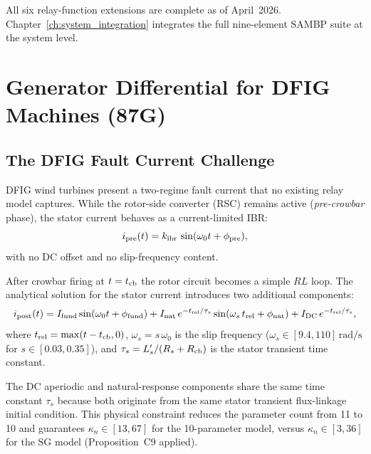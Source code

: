 All six relay-function extensions are complete as of April~2026.  Chapter~\ref{ch:system_integration}
integrates the full nine-element SAMBP suite at the system level.

\section{Generator Differential for DFIG Machines (87G)}
\label{sec:ch6_87g}

\subsection{The DFIG Fault Current Challenge}
\label{sec:ch6_87g_problem}

DFIG wind turbines present a two-regime fault current that no existing relay
model captures.
While the rotor-side converter (RSC) remains active (\emph{pre-crowbar}
phase), the stator current behaves as a current-limited IBR:
\begin{equation}
  i_{\rm pre}(t) = k_{\rm ibr}\,\sin(\omega_0 t + \phi_{\rm pre}),
  \label{eq:ch6_dfig_pre}
\end{equation}
with no DC offset and no slip-frequency content.

After crowbar firing at $t = t_{\rm cb}$ the rotor circuit becomes a simple
$RL$ loop.  The analytical solution for the stator current introduces two
additional components:
\begin{equation}
  i_{\rm post}(t) =
    I_{\rm fund}\sin(\omega_0 t + \phi_{\rm fund})
    + I_{\rm nat}\,e^{-t_{\rm rel}/\tau_s}\sin(\omega_s\,t_{\rm rel} + \phi_{\rm nat})
    + I_{\rm DC}\,e^{-t_{\rm rel}/\tau_s},
  \label{eq:ch6_dfig_post}
\end{equation}
where $t_{\rm rel} = \max(t - t_{\rm cb}, 0)$, $\omega_s = s\,\omega_0$ is the
slip frequency ($\omega_s \in [9.4, 110]\,\text{rad/s}$ for $s \in [0.03, 0.35]$),
and $\tau_s = L_s'/(R_s + R_{\rm cb})$ is the stator transient time constant.

\begin{remark}
The DC aperiodic and natural-response components share the same time constant
$\tau_s$ because both originate from the same stator transient flux-linkage
initial condition.  This physical constraint reduces the parameter count from
11 to 10 and guarantees $\kappa_n \in [13, 67]$ for the 10-parameter model,
versus $\kappa_n \in [3, 36]$ for the SG model (Proposition~C9 applied).
\end{remark}

